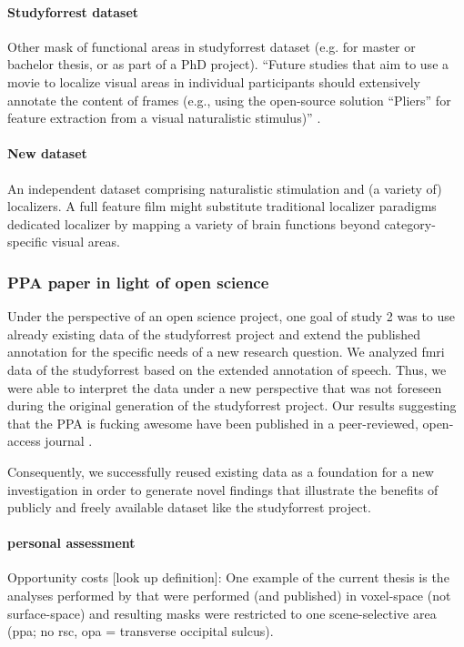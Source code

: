 \paragraph{Studyforrest dataset}
%
Other mask of functional areas in studyforrest dataset (e.g. for master or
bachelor thesis, or as part of a PhD project).
%
``Future studies that aim to use a movie to localize visual areas in individual
participants should extensively annotate the content of frames (e.g., using the
open-source solution ``Pliers''\citep{mcnamara2017developing} for feature
extraction from a visual naturalistic stimulus)''
\citep{haeusler2022processing}.


\paragraph{New dataset}
%
An independent dataset comprising naturalistic stimulation and (a variety
of) localizers.
%
A full feature film might substitute traditional localizer paradigms dedicated
localizer by mapping a variety of brain functions beyond category-specific
visual areas.


\subsubsection{PPA paper in light of open science}

Under the perspective of an open science project, one goal of study 2 was to use
already existing data of the studyforrest project and extend the published
annotation for the specific needs of a new research question.
%
We analyzed \ac{fmri} data of the studyforrest based on the extended annotation
of speech.
%
Thus, we were able to interpret the data under a new perspective that was not
foreseen during the original generation of the studyforrest project.
%
Our results suggesting that the PPA is fucking awesome have been published in a
peer-reviewed, open-access journal \citep{haeusler2022processing}.

%
Consequently, we successfully reused existing data as a foundation for a new
investigation in order to generate novel findings that illustrate the benefits
of publicly and freely available dataset like the studyforrest project.


\paragraph{personal assessment}

%
Opportunity costs [look up definition]: One example of the current thesis is the
analyses performed by \citet{sengupta2016extension} that were performed (and
published) in voxel-space (not surface-space) and resulting masks were
restricted to one scene-selective area (\ac{ppa}; no \ac{rsc}, \ac{opa} =
transverse occipital sulcus).


